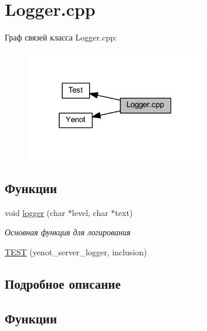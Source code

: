 \hypertarget{group__loggercpp}{}\section{Logger.\+cpp}
\label{group__loggercpp}
Граф связей класса Logger.\+cpp\+:
\nopagebreak
\begin{figure}[H]
\begin{center}
\leavevmode
\includegraphics[width=223pt]{group__loggercpp}
\end{center}
\end{figure}
\subsection*{Функции}
\begin{DoxyCompactItemize}
\item 
void \mbox{\hyperlink{group__loggercpp_ga0d6abeb129096910c85ae6cba8bb59cf}{logger}} (char $\ast$level, char $\ast$text)
\begin{DoxyCompactList}\small\item\em Основная функция для логирования \end{DoxyCompactList}\item 
\mbox{\hyperlink{group__loggercpp_ga10abf17037baa88fa1698c6759b8c4ad}{T\+E\+ST}} (yenot\+\_\+server\+\_\+logger, inclusion)
\end{DoxyCompactItemize}


\subsection{Подробное описание}


\subsection{Функции}
\mbox{\label{group__loggercpp_ga0d6abeb129096910c85ae6cba8bb59cf}} 
